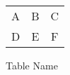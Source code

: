 \documentclass[12pt, a4paper]{report}
\begin{document}
\begin{figure}
\centering
\caption{Table Name}
\begin{tabular}{ccc}
A & B & C \\
D & E & F 
\end{tabular}
\end{figure}
\end{document}
